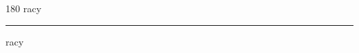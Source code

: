 
\begin{frame}
\begin{center}
\begin{turn}{180}
{\fontsize{2.5cm}{1em}\selectfont racy}
\end{turn}
\vspace{1em}\par  
\hrule
\vspace{1em}\par  
{\fontsize{2.5cm}{1em}\selectfont racy}
\end{center}
\end{frame}

